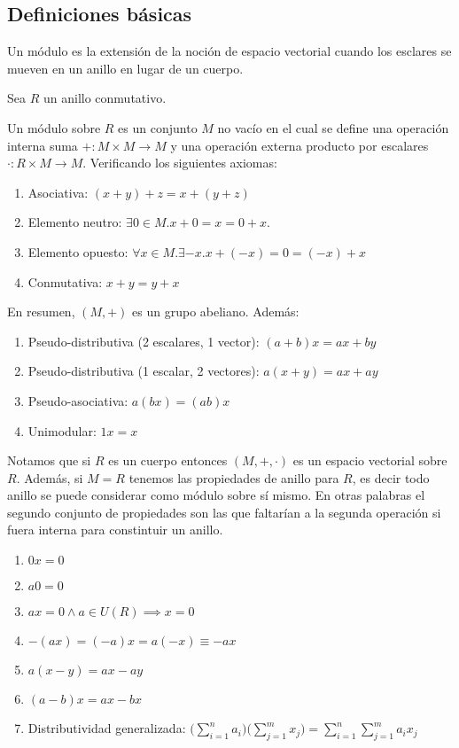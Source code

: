 \subsection{Definiciones básicas}

Un módulo es la extensión de la noción de espacio vectorial cuando los esclares se mueven en un anillo en lugar de un cuerpo. 

\begin{definition}[Módulo]
Sea $R$ un anillo conmutativo. 

Un módulo sobre $R$ es un conjunto $M$ no vacío en el cual se define una operación interna suma $+:M \times M \to M$ y una operación externa producto por escalares $\cdot:R \times M \to M$. Verificando los siguientes axiomas:

\begin{enumerate}
\item Asociativa: $(x+y)+z = x+(y+z)$
\item Elemento neutro: $\exists 0 \in M.x+0 = x = 0+x$.
\item Elemento opuesto: $\forall x \in M.\exists -x.x+(-x) = 0 = (-x)+x$
\item Conmutativa: $x+y = y+x$
\end{enumerate}

En resumen, $(M,+)$ es un grupo abeliano. Además:

\begin{enumerate}
\item Pseudo-distributiva (2 escalares, 1 vector): $(a+b)x = ax+by$
\item Pseudo-distributiva (1 escalar, 2 vectores): $a(x+y) = ax+ay$
\item Pseudo-asociativa: $a(bx) = (ab)x$
\item Unimodular: $1x = x$
\end{enumerate}
\end{definition}

Notamos que si $R$ es un cuerpo entonces $(M,+,\cdot)$ es un espacio vectorial sobre $R$. Además, si $M = R$ tenemos las propiedades de anillo para $R$, es decir todo anillo se puede considerar como módulo sobre sí mismo. En otras palabras el segundo conjunto de propiedades son las que faltarían a la segunda operación si fuera interna para constintuir un anillo. 

\begin{corollary}
\begin{enumerate}
\item $0x = 0$
\item $a0 = 0$
\item $ax = 0 \land a \in U(R) \implies x = 0$
\item $-(ax) = (-a)x = a(-x) \equiv -ax$
\item $a(x-y) = ax-ay$
\item $(a-b)x = ax - bx$
\item Distributividad generalizada: $\Big(\sum_{i = 1}^n a_i\Big)\Big(\sum_{j = 1}^m x_j\Big) = \sum_{i = 1}^n \sum_{j = 1}^m a_ix_j$
\end{enumerate}
\end{corollary}

